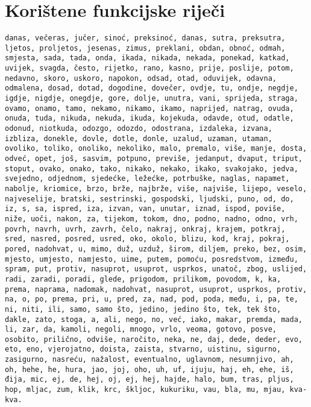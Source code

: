 \documentclass{article}
\begin{document}
\section{Korištene funkcijske riječi}
\label{sec:koristene-fw}
\texttt{danas, večeras, jučer, sinoć, preksinoć, danas, sutra, preksutra, ljetos,
proljetos, jesenas, zimus, preklani, obdan, obnoć, odmah, smjesta, sada, tada,
onda, ikada, nikada, nekada, ponekad, katkad, uvijek, svagda, često, rijetko,
rano, kasno, prije, poslije, potom, nedavno, skoro, uskoro, napokon, odsad, otad,
oduvijek, odavna, odmalena, dosad, dotad, dogodine, dovečer, ovdje, tu, ondje,
negdje, igdje, nigdje, onegdje, gore, dolje, unutra, vani, sprijeda, straga,
ovamo, onamo, tamo, nekamo, nikamo, ikamo, naprijed, natrag, ovuda, onuda, tuda,
nikuda, nekuda, ikuda, kojekuda, odavde, otud, odatle, odonud, niotkuda, odozgo,
odozdo, odostrana, izdaleka, izvana, izbliza, donekle, dovle, dotle, donle,
uzalud, uzaman, utaman, ovoliko, toliko, onoliko, nekoliko, malo, premalo, više,
manje, dosta, odveć, opet, još, sasvim, potpuno, previše, jedanput, dvaput,
triput, stoput, ovako, onako, tako, nikako, nekako, ikako, svakojako, jedva,
svejedno, odjednom, sjedećke, ležećke, potrbuške, naglas, napamet, nabolje,
kriomice, brzo, brže, najbrže, više, najviše, lijepo, veselo, najveselije,
bratski, sestrinski, gospodski, ljudski, puno, od, do, iz, s, sa, ispred, iza,
izvan, van, unutar, iznad, ispod, poviše, niže, uoči, nakon, za, tijekom, tokom,
dno, podno, nadno, odno, vrh, povrh, navrh, uvrh, zavrh, čelo, nakraj, onkraj,
krajem, potkraj, sred, nasred, posred, usred, oko, okolo, blizu, kod, kraj,
pokraj, pored, nadohvat, u, mimo, duž, uzduž, širom, diljem, preko, bez, osim,
mjesto, umjesto, namjesto, uime, putem, pomoću, posredstvom, između, spram, put,
protiv, nasuprot, usuprot, usprkos, unatoč, zbog, uslijed, radi, zaradi, poradi,
glede, prigodom, prilikom, povodom, k, ka, prema, naprama, nadomak, nadohvat,
nasuprot, usuprot, usprkos, protiv, na, o, po, prema, pri, u, pred, za, nad, pod,
poda, među, i, pa, te, ni, niti, ili, samo, samo što, jedino, jedino što, tek,
tek što, dakle, zato, stoga, a, ali, nego, no, već, iako, makar, premda, mada,
li, zar, da, kamoli, negoli, mnogo, vrlo, veoma, gotovo, posve, osobito,
prilično, odviše, naročito, neka, ne, daj, dede, deder, evo, eto, eno,
vjerojatno, doista, zaista, stvarno, uistinu, sigurno, zasigurno, nasreću,
nažalost, eventualno, uglavnom, nesumnjivo, ah, oh, hehe, he, hura, jao, joj,
oho, uh, uf, ijuju, haj, eh, ehe, iš, đija, mic, ej, de, hej, oj, ej, hej, hajde,
halo, bum, tras, pljus, hop, mljac, zum, klik, krc, škljoc, kukuriku, vau, bla,
mu, mjau, kva-kva.}
\end{document}
